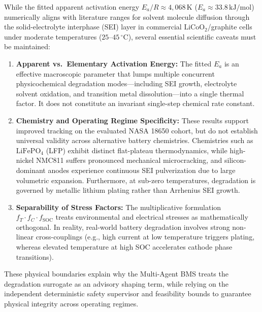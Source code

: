 While the fitted apparent activation energy $E_a / R \approx 4{,}068\,\mathrm{K}$
($E_a \approx 33.8\,\mathrm{kJ/mol}$) numerically aligns with literature
ranges for solvent molecule diffusion through the solid-electrolyte
interphase (SEI) layer in commercial $\mathrm{LiCoO}_2$/graphite cells
under moderate temperatures ($25\text{--}45\,^\circ\mathrm{C}$), several
essential scientific caveats must be maintained:
\begin{enumerate}
  \item \textbf{Apparent vs.\ Elementary Activation Energy:} The fitted
  $E_a$ is an effective macroscopic parameter that lumps multiple concurrent
  physicochemical degradation modes---including SEI growth, electrolyte solvent
  oxidation, and transition metal dissolution---into a single thermal factor.
  It does not constitute an invariant single-step chemical rate constant.
  \item \textbf{Chemistry and Operating Regime Specificity:} These results
  support improved tracking on the evaluated NASA 18650 cohort, but do not
  establish universal validity across alternative battery chemistries.
  Chemistries such as $\mathrm{LiFePO}_4$ (LFP) exhibit distinct flat-plateau
  thermodynamics, while high-nickel NMC811 suffers pronounced mechanical
  microcracking, and silicon-dominant anodes experience continuous SEI
  pulverization due to large volumetric expansion.  Furthermore, at sub-zero
  temperatures, degradation is governed by metallic lithium plating rather
  than Arrhenius SEI growth.
  \item \textbf{Separability of Stress Factors:} The multiplicative
  formulation $f_T \cdot f_C \cdot f_{\mathrm{SOC}}$ treats environmental and
  electrical stresses as mathematically orthogonal.  In reality, real-world
  battery degradation involves strong non-linear cross-couplings (e.g., high
  current at low temperature triggers plating, whereas elevated temperature
  at high SOC accelerates cathode phase transitions).
\end{enumerate}
These physical boundaries explain why the Multi-Agent BMS treats the
degradation surrogate as an advisory shaping term, while relying on the
independent deterministic safety supervisor and feasibility bounds to
guarantee physical integrity across operating regimes.
